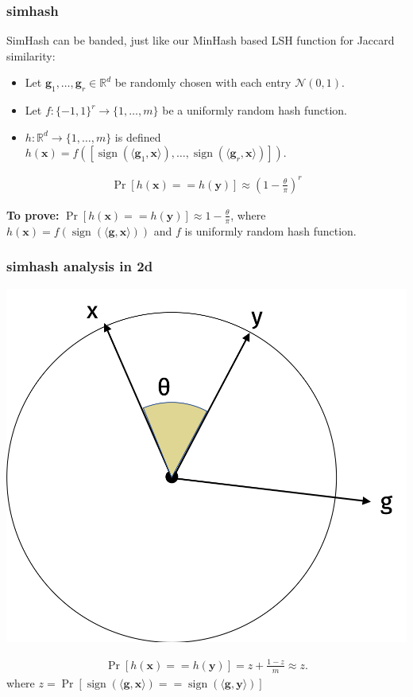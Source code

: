 \documentclass[compress]{beamer}
\newcommand{\bv}[1]{\mathbf{#1}}
\newcommand{\R}{\mathbb{R}}
\DeclareMathOperator{\sign}{sign}
\begin{document}
\begin{frame}
	\frametitle{simhash}
	SimHash can be banded, just like our MinHash based LSH function for Jaccard similarity:
	\begin{itemize}
		\item Let $\bv{g}_1,\ldots, \bv{g}_r \in \R^d$ be randomly chosen with each entry $\mathcal{N}(0,1)$. 
		\item Let $f: \{-1,1\}^r \rightarrow \{1,\ldots, m\}$ be a uniformly random hash function. 
		\item $h: \R^d \rightarrow \{1,\ldots, m\}$ is defined $h(\bv{x}) = f\left([\sign(\langle \bv{g}_1, \bv{x} \rangle),\ldots, \sign(\langle \bv{g}_r, \bv{x} \rangle)]\right)$.
	\end{itemize}
\begin{align*}
	\Pr[h(\bv{x}) == h(\bv{y})] \approx \left(1-\frac{\theta}{\pi}\right)^r
\end{align*}
\end{frame}

\begin{frame}
	\textbf{To prove:}  $\Pr[h(\bv{x}) == h(\bv{y})] \approx 1 - \frac{\theta}{\pi}$,  where $h(\bv{x}) = f\left(\sign(\langle \bv{g}, \bv{x} \rangle)\right)$ and $f$ is uniformly random hash function.
	\frametitle{simhash analysis in 2d}
	\vspace{-.5em}
	\begin{center}
		\includegraphics[width=.5\textwidth]{simhash1.png}
	\end{center}
\begin{align*}
	\Pr[h(\bv{x}) == h(\bv{y})] = z + \frac{1-z}{m} \approx z.
\end{align*}
where $z = \Pr[\sign(\langle \bv{g}, \bv{x} \rangle) == \sign(\langle \bv{g}, \bv{y} \rangle)]$
\end{frame}
\end{document}
